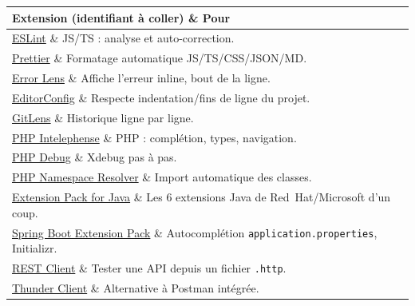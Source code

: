 \documentclass[12pt,a4paper,twoside,openright]{book}
\makeatletter
\newcommand{\fichier}[1]{\texttt{\color{pathgreen}#1}}
\providecommand{\cmd}[1]{}%
\renewcommand{\cmd}[1]{\srcbox{\texttt{\detokenize{#1}}}}
\newcommand{\link}[2]{\href{#2}{#1}}
\newenvironment{tabz}[1]{\rowcolors{2}{white}{tralight}%
  \small\setlength{\tabcolsep}{5pt}\setlength{\LTpre}{3pt}\setlength{\LTpost}{3pt}%
  \begin{longtable}{@{}#1@{}}\toprule}
  {\bottomrule\end{longtable}\normalfont\setlength{\tabcolsep}{6pt}}
\newcommand{\thd}[1]{\textbf{\color{white}#1}}
\newcommand{\headrow}{\rowcolor{theadbg}}
\makeatother
\begin{document}
\begin{tabz}{Xl}
  \headrow \thd{Extension (identifiant \`a coller)} \& \thd{Pour} \\
  \midrule
  \link{ESLint}{https://marketplace.visualstudio.com/items?itemName=dbaeumer.vscode-eslint} \cmd{dbaeumer.vscode-eslint} \& JS/TS : analyse et auto-correction.\\
  \link{Prettier}{https://marketplace.visualstudio.com/items?itemName=esbenp.prettier-vscode} \cmd{esbenp.prettier-vscode} \& Formatage automatique JS/TS/CSS/JSON/MD.\\
  \link{Error Lens}{https://marketplace.visualstudio.com/items?itemName=usernamehw.errorlens} \cmd{usernamehw.errorlens} \& Affiche l'erreur inline, bout de la ligne.\\
  \link{EditorConfig}{https://marketplace.visualstudio.com/items?itemName=EditorConfig.EditorConfig} \cmd{EditorConfig.EditorConfig} \& Respecte indentation/fins de ligne du projet.\\
  \link{GitLens}{https://marketplace.visualstudio.com/items?itemName=eamodio.gitlens} \cmd{eamodio.gitlens} \& Historique ligne par ligne.\\
  \link{PHP Intelephense}{https://marketplace.visualstudio.com/items?itemName=bmewburn.vscode-intelephense-client} \cmd{bmewburn.vscode-intelephense-client} \& PHP : compl\'etion, types, navigation.\\
  \link{PHP Debug}{https://marketplace.visualstudio.com/items?itemName=xdebug.php-debug} \cmd{xdebug.php-debug} \& Xdebug pas \`a pas.\\
  \link{PHP Namespace Resolver}{https://marketplace.visualstudio.com/items?itemName=mehedidrac PHP Namespace Resolver} \& Import automatique des classes.\\
  \link{Extension Pack for Java}{https://marketplace.visualstudio.com/items?itemName=vscjava.vscode-java-pack} \cmd{vscjava.vscode-java-pack} \& Les 6 extensions Java de Red~Hat/Microsoft d'un coup.\\
  \link{Spring Boot Extension Pack}{https://marketplace.visualstudio.com/items?itemName=vmware.vscode-boot-dev-pack} \& Autocompl\'etion \verb|application.properties|, Initializr.\\
  \link{REST Client}{https://marketplace.visualstudio.com/items?itemName=humao.rest-client} \cmd{humao.rest-client} \& Tester une API depuis un fichier \fichier{.http}.\\
  \link{Thunder Client}{https://www.thunderclient.com/} \& Alternative \`a Postman int\'egr\'ee.\\

\end{tabz}
\end{document}
